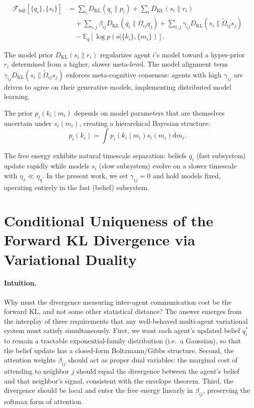 \documentclass[twoside,11pt]{article}
\begin{document}
\begin{equation}
\begin{aligned}
\mathcal{F}_{\text{full}}[\{q_i\},\{s_i\}]
&=\sum_i D_{\mathrm{KL}}(q_i \| p_i)
+\sum_i D_{\mathrm{KL}}(s_i \| r_i)\\
&\quad+\sum_{i,j}\beta_{ij} D_{\mathrm{KL}}(q_i \| \Omega_{ij}q_j)
+\sum_{i,j}\gamma_{ij} D_{\mathrm{KL}}(s_i \| \tilde{\Omega}_{ij}s_j)\\
&\quad-\mathbb{E}_q[\log p(o |\{k_i\},\{m_i\})].
\end{aligned}
\label{eq:free_energy_full_supp}
\end{equation}

The model prior $D_{\mathrm{KL}}(s_i \| r_i)$ regularizes agent $i$'s model toward a hyper-prior $r_i$ determined from a higher, slower meta-level. The model alignment term $\gamma_{ij} D_{\mathrm{KL}}(s_i \| \tilde{\Omega}_{ij} s_j)$ enforces meta-cognitive consensus: agents with high $\gamma_{ij}$ are driven to agree on their generative models, implementing distributed model learning.

The prior $p_i(k_i \mid m_i)$ depends on model parameters that are themselves uncertain under $s_i(m_i)$, creating a hierarchical Bayesian structure:
\begin{equation}
p_i(k_i) = \int p_i(k_i \mid m_i) s_i(m_i) \mathrm{d}m_i.
\end{equation}

The free energy exhibits natural timescale separation: beliefs $q_i$ (fast subsystem) update rapidly while models $s_i$ (slow subsystem) evolve on a slower timescale with $\eta_s \ll \eta_q$. In the present work, we set $\gamma_{ij} = 0$ and hold models fixed, operating entirely in the fast (belief) subsystem.


\section{Conditional Uniqueness of the Forward KL Divergence via Variational Duality}
\label{sec:supp_conditional_uniqueness}

\paragraph{Intuition.}
Why must the divergence measuring inter-agent communication cost be the forward KL, and not some other statistical distance? The answer emerges from the interplay of three requirements that any well-behaved multi-agent variational system must satisfy simultaneously. First, we want each agent's updated belief $q_i^*$ to remain a tractable exponential-family distribution (i.e.\ a Gaussian), so that the belief update has a closed-form Boltzmann/Gibbs structure. Second, the attention weights $\beta_{ij}$ should act as proper dual variables: the marginal cost of attending to neighbor $j$ should equal the divergence between the agent's belief and that neighbor's signal, consistent with the envelope theorem. Third, the divergence should be local and enter the free energy linearly in $\beta_{ij}$, preserving the softmax form of attention.
\end{document}
